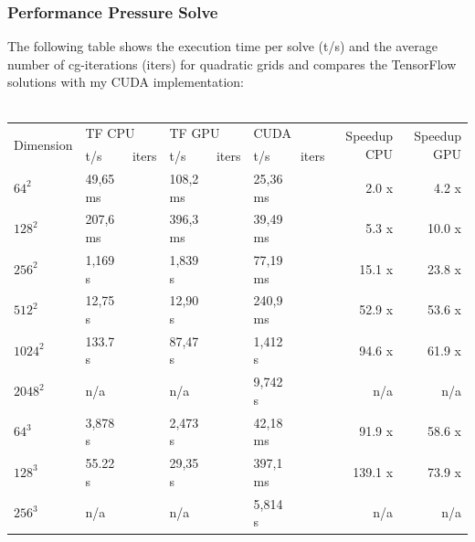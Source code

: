\subsubsection{Performance Pressure Solve}
The following table shows the execution time per solve (t/s) and the average number of cg-iterations (iters) for quadratic grids and compares the TensorFlow solutions with my CUDA implementation: \\\\
\renewcommand{\arraystretch}{1.36}
\small
\begin{tabular}{l||l|l|l|l|l|l||r|r}
\hline
\multirow{2}{*}{Dimension} & \multicolumn{2}{l|}{TF CPU} & \multicolumn{2}{l|}{TF GPU} & \multicolumn{2}{l||}{CUDA} & \multirow{2}{*}{Speedup CPU} & \multirow{2}{*}{Speedup GPU} \\ \cline{2-7} 
                  & t/s        & iters        & t/s        & iters        & t/s         & iters        &             &             \\ \hline
$64^2$   & 49,65 ms &  & 108,2 ms &  & 25,36 ms &  & 2.0 x   & 4.2 x  \\ \hline
$128^2$  & 207,6 ms &  & 396,3 ms &  & 39,49 ms &  & 5.3 x   & 10.0 x \\ \hline
$256^2$  & 1,169 s  &   & 1,839 s &  & 77,19 ms &  & 15.1 x  & 23.8 x \\ \hline
$512^2$  & 12,75 s  &   & 12,90 s &  & 240,9 ms &  & 52.9 x  & 53.6 x \\ \hline
$1024^2$ & 133.7 s  &   & 87,47 s &  & 1,412 s  &  & 94.6 x  & 61.9 x \\ \hline
$2048^2$ & n/a      &   & n/a     &  & 9,742 s  &  & n/a     & n/a    \\ \hline \hline

$64^3$   & 3,878 s  &  & 2,473 s  &  & 42,18 ms &  & 91.9 x  & 58.6 x \\ \hline
$128^3$  & 55.22 s  &  & 29,35 s  &  & 397,1 ms &  & 139.1 x & 73.9 x \\ \hline
$256^3$  & n/a      &  & n/a      &  & 5,814 s  &  & n/a  & n/a 		  \\ \hline
\end{tabular}
\normalsize

